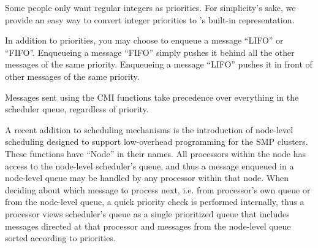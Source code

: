 Some people only want regular integers as priorities.  For
simplicity's sake, we provide an easy way to convert integer
priorities to \converse{}'s built-in representation.

In addition to priorities, you may choose to enqueue a message
``LIFO'' or ``FIFO''.  Enqueueing a message ``FIFO'' simply pushes it
behind all the other messages of the same priority.  Enqueueing a
message ``LIFO'' pushes it in front of other messages of the same
priority.

Messages sent using the CMI functions take precedence over everything
in the scheduler queue, regardless of priority.

A recent addition\experimental{} to \converse{} scheduling mechanisms is 
the introduction of
node-level scheduling designed to support low-overhead programming for the
SMP clusters. These functions have ``Node'' in their names. All processors
within the node has access to the node-level scheduler's queue, and thus
a message enqueued in a node-level queue may be handled by any processor within
that node. When deciding about which message to process next, i.e. from
processor's own queue or from the node-level queue, a quick priority check
is performed internally, thus a processor views scheduler's queue as a single
prioritized queue that includes messages directed at that processor and
messages from the node-level queue sorted according to priorities.


